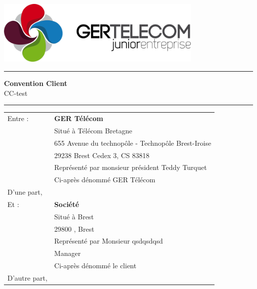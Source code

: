 \documentclass[10pt,a4paper]{article}
\renewcommand{\headrulewidth}{0pt}
\begin{document}
\centering
\includegraphics[width=10cm]{GER.png}\\
\rule{\linewidth}{.5pt}
\Huge \textbf{\textsf{Convention Client}}\\
\vspace{0.2cm}
\huge \textsf{CC-test}
\rule{\linewidth}{.5pt}
\normalsize
\flushleft
\vspace{1cm}
\begin{tabular}{ll}
Entre : 	&\textbf{GER Télécom}\\
&Situé à Télécom Bretagne \\
&655 Avenue du technopôle - Technopôle Brest-Iroise \\
&29238 Brest Cedex 3, CS 83818\\
&Représenté par monsieur président Teddy Turquet\\
\vspace{0.5cm}&Ci-après dénommé GER Télécom\\
\vspace{1cm}D'une part,\\
Et :		&\textbf{Société}\\
&Situé à Brest\\
&29800 , Brest\\
&Représenté par Monsieur qsdqsdqsd\\
&Manager\\
\vspace{0.5cm}&Ci-après dénommé le client\\
D'autre part,\\
\end{tabular}
\newpage
\renewcommand{\headrulewidth}{0pt}

\lipsum[1]
\lipsum[1]
\lipsum[1]
\lipsum[1]
\lipsum[1]
\lipsum[1]
\lipsum[1]
\lipsum[1]
\lipsum[1]
\lipsum[1]
\lipsum[1]
\lipsum[1]
\lipsum[1]
\lipsum[1]
\lipsum[1]
\lipsum[1]
\lipsum[1]
\lipsum[1]
\end{document}
